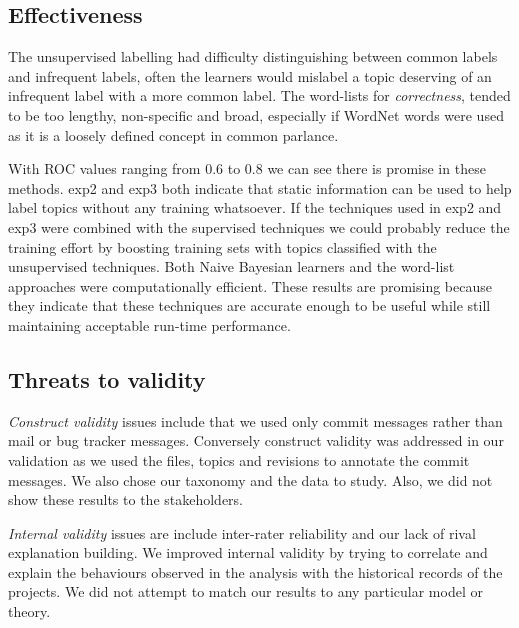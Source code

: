 \documentclass[]{sig-alternate}
\begin{document}
\subsection{Effectiveness}

The unsupervised labelling had difficulty distinguishing between common labels and infrequent labels, often the learners would mislabel a topic deserving of an infrequent label with a more common label.
The word-lists for \emph{correctness}, tended to be too lengthy, non-specific and broad, especially if WordNet words were used as it is a loosely defined concept in common parlance.

With ROC values ranging from $0.6$ to $0.8$ we can see there is promise in these methods.
\textsf{exp2} and \textsf{exp3} both indicate that static information can be used to help label topics without any training whatsoever. 
If the techniques used in \textsf{exp2} and \textsf{exp3} were combined with the supervised techniques we could probably reduce the training effort by boosting training sets with topics classified with the unsupervised techniques.
Both Naive Bayesian learners and the word-list approaches were computationally efficient.  
These results are promising because they indicate that these techniques are accurate enough to be useful while still maintaining acceptable run-time performance.


\subsection{Threats to validity}


\emph{Construct validity} issues include that we used only commit messages rather than mail or bug tracker messages. 
Conversely construct validity was addressed in our validation as we used the files, topics and revisions to annotate the commit messages.
We also chose our taxonomy and the data to study. Also, we did not show these results to the stakeholders.

\emph{Internal validity} issues are include inter-rater reliability and our lack of rival explanation building. 
We improved internal validity by trying to correlate and explain the behaviours observed in the analysis with the historical records of the projects.
We did not attempt to match our results to any particular model or theory.
\end{document}
